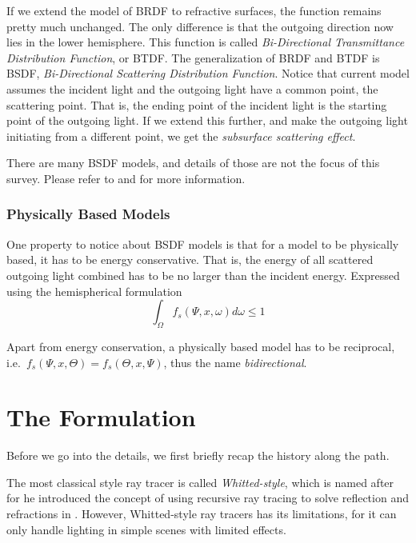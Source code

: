 \documentclass[]{book}
\begin{document}
If we extend the model of BRDF to refractive surfaces, the function remains pretty much unchanged.
The only difference is that the outgoing direction now lies in the lower hemisphere.
This function is called \textit{Bi-Directional Transmittance Distribution Function}, or BTDF.
The generalization of BRDF and BTDF is BSDF, \textit{Bi-Directional Scattering Distribution Function}.
Notice that current model assumes the incident light and the outgoing light have a common point, the scattering point.
That is, the ending point of the incident light is the starting point of the outgoing light.
If we extend this further, and make the outgoing light initiating from a different point, we get the \textit{subsurface scattering effect}.

There are many BSDF models, and details of those are not the focus of this survey.
Please refer to \cite{AdvancedGI} and \cite{PBRT3e} for more information.

\subsubsection*{Physically Based Models}
One property to notice about BSDF models is that for a model to be physically based, it has to be energy conservative.
That is, the energy of all scattered outgoing light combined has to be no larger than the incident energy.
Expressed using the hemispherical formulation
\begin{equation}
	\int_{\Omega}f_{s}(\Psi, x, \omega) d\omega \leq 1
\end{equation}

Apart from energy conservation, a physically based model has to be reciprocal, i.e.\ $f_{s}(\Psi, x, \Theta) = f_{s}(\Theta, x, \Psi)$, thus the name \textit{bidirectional}.

\section{The Formulation}
\label{sec:GI:formulation}
Before we go into the details, we first briefly recap the history along the path.

The most classical style ray tracer is called \textit{Whitted-style}, which is named after \citeauthor{whitted1979improved} for he introduced the concept of using recursive ray tracing to solve reflection and refractions in \citeyear{whitted1979improved} \cite{whitted1979improved}.
However, Whitted-style ray tracers has its limitations, for it can only handle lighting in simple scenes with limited effects.
\end{document}
